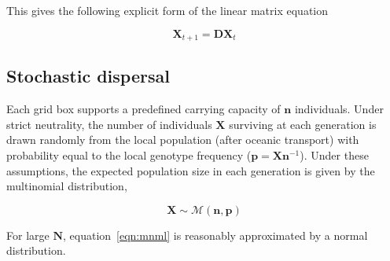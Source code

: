 \documentclass[12pt]{article}
\begin{document}
This gives the following explicit form of the linear matrix equation

\begin{equation}
\label{ }
\mathbf{X}_{t+1}=\mathbf{D}\mathbf{X}_{t}
\end{equation}




\subsection{Stochastic dispersal}

Each grid box supports a predefined carrying capacity of $\mathbf{n}$ individuals. Under strict neutrality, the number of individuals $\mathbf{X}$ surviving at each generation is drawn randomly from the local population (after oceanic transport) with probability equal to the local genotype frequency ($\mathbf{p} = \mathbf{X} \mathbf{n}^{-1}$). Under these assumptions, the expected population size in each generation is given by the multinomial distribution, 

\begin{equation}
\label{eqn:mnml}
\mathbf{X}\sim\mathcal{M}(\mathbf{n},\mathbf{p})
\end{equation}

For large $\mathbf{N}$, equation~\ref{eqn:mnml} is reasonably approximated by a normal distribution.
\end{document}
